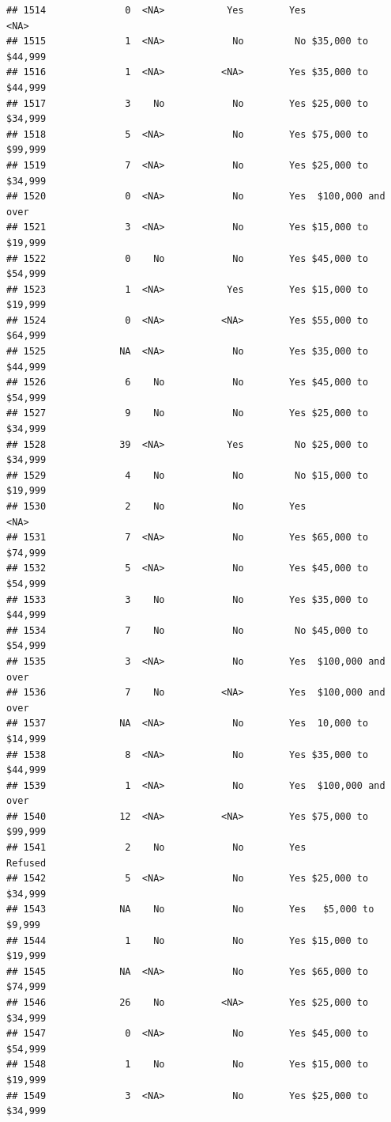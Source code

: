 \documentclass[man]{apa6}
\begin{document}
\begin{verbatim}
## 1514              0  <NA>           Yes        Yes               <NA>
## 1515              1  <NA>            No         No $35,000 to $44,999
## 1516              1  <NA>          <NA>        Yes $35,000 to $44,999
## 1517              3    No            No        Yes $25,000 to $34,999
## 1518              5  <NA>            No        Yes $75,000 to $99,999
## 1519              7  <NA>            No        Yes $25,000 to $34,999
## 1520              0  <NA>            No        Yes  $100,000 and over
## 1521              3  <NA>            No        Yes $15,000 to $19,999
## 1522              0    No            No        Yes $45,000 to $54,999
## 1523              1  <NA>           Yes        Yes $15,000 to $19,999
## 1524              0  <NA>          <NA>        Yes $55,000 to $64,999
## 1525             NA  <NA>            No        Yes $35,000 to $44,999
## 1526              6    No            No        Yes $45,000 to $54,999
## 1527              9    No            No        Yes $25,000 to $34,999
## 1528             39  <NA>           Yes         No $25,000 to $34,999
## 1529              4    No            No         No $15,000 to $19,999
## 1530              2    No            No        Yes               <NA>
## 1531              7  <NA>            No        Yes $65,000 to $74,999
## 1532              5  <NA>            No        Yes $45,000 to $54,999
## 1533              3    No            No        Yes $35,000 to $44,999
## 1534              7    No            No         No $45,000 to $54,999
## 1535              3  <NA>            No        Yes  $100,000 and over
## 1536              7    No          <NA>        Yes  $100,000 and over
## 1537             NA  <NA>            No        Yes  10,000 to $14,999
## 1538              8  <NA>            No        Yes $35,000 to $44,999
## 1539              1  <NA>            No        Yes  $100,000 and over
## 1540             12  <NA>          <NA>        Yes $75,000 to $99,999
## 1541              2    No            No        Yes            Refused
## 1542              5  <NA>            No        Yes $25,000 to $34,999
## 1543             NA    No            No        Yes   $5,000 to $9,999
## 1544              1    No            No        Yes $15,000 to $19,999
## 1545             NA  <NA>            No        Yes $65,000 to $74,999
## 1546             26    No          <NA>        Yes $25,000 to $34,999
## 1547              0  <NA>            No        Yes $45,000 to $54,999
## 1548              1    No            No        Yes $15,000 to $19,999
## 1549              3  <NA>            No        Yes $25,000 to $34,999

\end{verbatim}
\end{document}
